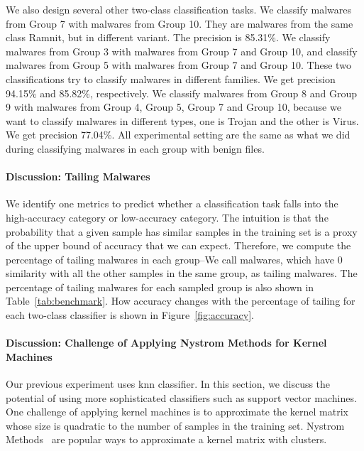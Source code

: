 We also design several other two-class classification tasks. 
We classify malwares from Group 7 with malwares from Group 10. 
They are malwares from the same class Ramnit, but in different variant. 
The precision is 85.31\%. 
We classify malwares from Group 3 with malwares from Group 7 and Group 10, 
and classify malwares from Group 5 with malwares from Group 7 and Group 10. 
These two classifications try to classify malwares in different families. 
We get precision 94.15\% and 85.82\%, respectively. 
We classify malwares from Group 8 and Group 9 with malwares from Group 4, Group 5, Group 7 and Group 10, 
because we want to classify malwares in different types, one is Trojan and the other is Virus. We get precision 77.04\%. 
All experimental setting are the same as what we did during classifying malwares in each group with benign files. 

\paragraph*{Discussion: Tailing Malwares}

We identify one metrics to predict whether
a classification task falls into the
high-accuracy category or low-accuracy
category. The intuition is that the probability
that a given sample has similar samples in
the training set is a proxy of the upper bound
of accuracy that we can expect. Therefore,
we compute the percentage of tailing malwares in each group--We call malwares, which have 0 similarity with all the other samples in the same group, as tailing malwares. 
The percentage of tailing malwares for each sampled group is also shown in Table~\ref{tab:benchmark}. 
How accuracy changes with the percentage of tailing for each two-class classifier is shown in Figure~\ref{fig:accuracy}. 


\paragraph*{Discussion: Challenge of Applying Nystrom Methods for Kernel Machines}

%

Our previous experiment uses knn classifier.
In this section, we discuss the potential of using
more sophisticated classifiers such as
support vector machines. One challenge
of applying kernel machines is to
approximate the kernel matrix whose
size is quadratic to the number of samples
in the training set. Nystrom Methods~\cite{clustering-purpose} are popular ways to
approximate a kernel matrix with clusters.

